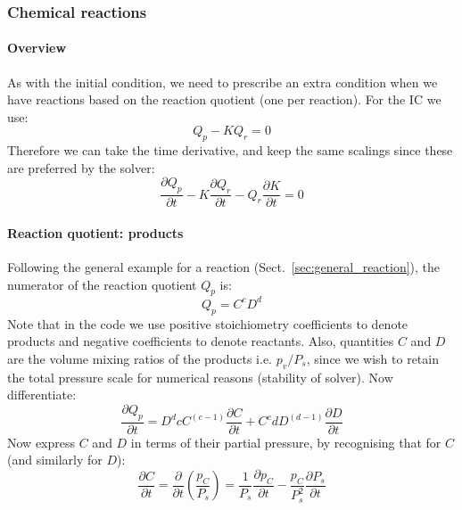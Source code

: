 \subsubsection{Chemical reactions}
\paragraph{Overview}
As with the initial condition, we need to prescribe an extra condition when we have reactions based on the reaction quotient (one per reaction).  For the IC we use:
\begin{equation}
Q_p - K Q_r = 0
\end{equation}
Therefore we can take the time derivative, and keep the same scalings since these are preferred by the solver:
\begin{equation}
\frac{\partial Q_p}{\partial t} - K \frac{\partial Q_r}{\partial t} - Q_r \frac{\partial K}{\partial t} = 0
\end{equation}
\paragraph{Reaction quotient: products}
Following the general example for a reaction (Sect.~\ref{sec:general_reaction}), the numerator of the reaction quotient $Q_p$ is:
\begin{equation}
Q_p = C^c D^d
\end{equation}
Note that in the code we use positive stoichiometry coefficients to denote products and negative coefficients to denote reactants.  Also, quantities $C$ and $D$ are the volume mixing ratios of the products i.e. $p_v/P_s$, since we wish to retain the total pressure scale for numerical reasons (stability of solver).  Now differentiate:
\begin{equation}
\frac{\partial Q_p}{\partial t} = D^d c C^{(c-1)} \frac{\partial C}{\partial t} + C^c d D^{(d-1)} \frac{\partial D}{\partial t}
\end{equation}
Now express $C$ and $D$ in terms of their partial pressure, by recognising that for $C$ (and similarly for $D$):
\begin{equation}
\frac{\partial C}{\partial t} = \frac{\partial}{\partial t} \left( \frac{p_C}{P_s} \right) = \frac{1}{P_s} \frac{\partial p_C}{\partial t} - \frac{p_C}{P_s^2} \frac{\partial P_s}{\partial t}
\end{equation}
